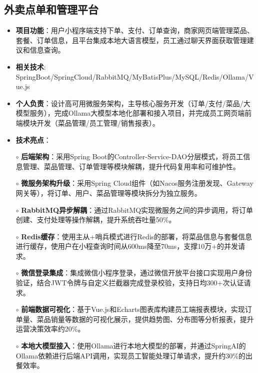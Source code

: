 \subsection{\textbf{外卖点单和管理平台} \hspace{2cm}{2025.01 -- 2025.04}}
    \begin{normalsize}
      \begin{itemize}
        \item \textbf{项目功能}：用户小程序端支持下单、支付、订单查询，商家网页端管理菜品、套餐、订单信息，且平台集成本地大语言模型，员工通过聊天界面获取管理建议和信息查询。
        \item \textbf{相关技术}: SpringBoot/SpringCloud/RabbitMQ/MyBatisPlus/MySQL/Redis/Ollama/Vue.js
        \item \textbf{个人负责}：设计高可用微服务架构，主导核心服务开发（订单/支付/菜品/大模型服务），完成Ollama大模型本地化部署和接入项目，并完成员工网页端前端模块开发（菜品管理/员工管理/销售报表）。
        \item \textbf{技术亮点}：
        \setlength{\itemindent}{1em} %
          \item[$\circ$] \textbf{后端架构}：采用Spring Boot的Controller-Service-DAO分层模式，将员工信息管理、菜品管理、订单管理等模块解耦，提升代码复用率和可维护性。
          \item[$\circ$] \textbf{微服务架构升级}：采用Spring Cloud组件（如Nacos服务注册发现、Gateway网关等），将订单、用户、菜品管理等模块拆分为独立服务。
          \item[$\circ$] \textbf{RabbitMQ异步解耦​​}：通过RabbitMQ实现微服务之间的异步调用，将订单创建、支付处理等操作解耦，提升系统吞吐量50\%。
          \item[$\circ$] \textbf{Redis缓存}：使用主从+哨兵模式进行Redis的部署，将菜品信息与套餐信息进行缓存，使用户在小程查询时间从600ms降至70ms，支撑10万+的并发请求。
          \item[$\circ$] \textbf{微信登录集成}：集成微信小程序登录，通过微信开放平台接口实现用户身份验证，结合JWT令牌与自定义拦截器完成登录校验，支持日均300+次认证请求。
          \item[$\circ$] \textbf{前端数据可视化}：基于Vue.js和Echarts图表库构建员工端报表模块，实现订单量、菜品销量等数据的可视化展示，提供趋势图、分布图等分析报表，提升运营决策效率约20\%。
          \item[$\circ$] \textbf{本地大模型接入}：使用Ollama进行本地大模型的部署，并通过SpringAI的Ollama依赖进行后端API调用，实现员工智能处理订单请求，提升约30\%的出餐效率。
        \end{itemize}
    \end{normalsize}